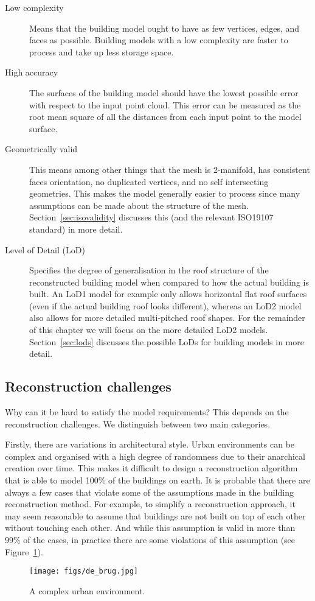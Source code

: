 \begin{description}
	\item[Low complexity] Means that the building model ought to have as few vertices, edges, and faces as possible. Building models with a low complexity are faster to process and take up less storage space.
	\item[High accuracy] The surfaces of the building model should have the lowest possible error with respect to the input point cloud. This error can be measured as the root mean square of all the distances from each input point to the model surface. 
	\item[Geometrically valid] This means among other things that the mesh is 2-manifold, has consistent faces orientation, no duplicated vertices, and no self intersecting geometries. This makes the model generally easier to process since many assumptions can be made about the structure of the mesh. Section~\ref{sec:isovalidity} discusses this (and the relevant ISO19107 standard) in more detail.
	\item[Level of Detail (LoD)] Specifies the degree of generalisation in the roof structure of the reconstructed building model when compared to how the actual building is built. An LoD1 model for example only allows horizontal flat roof surfaces (even if the actual building roof looks different), whereas an LoD2 model also allows for more detailed multi-pitched roof shapes. For the remainder of this chapter we will focus on the more detailed LoD2 models. Section~\ref{sec:lods} discusses the possible LoDs for building models in more detail.
\end{description}

\subsection{Reconstruction challenges}
Why can it be hard to satisfy the model requirements? This depends on the reconstruction challenges. We distinguish between two main categories.

Firstly, there are variations in architectural style. Urban environments can be complex and organised with a high degree of randomness due to their anarchical creation over time. This makes it difficult to design a reconstruction algorithm that is able to model 100\% of the buildings on earth. It is probable that there are always a few cases that violate some of the assumptions made in the building reconstruction method. For example, to simplify a reconstruction approach, it may seem reasonable to assume that buildings are not built on top of each other without touching each other. And while this assumption is valid in more than 99\% of the cases, in practice there are some violations of this assumption (see Figure~\ref{fig:debrug}).
\begin{figure}
	\centering
	\texttt{[image: figs/de\_brug.jpg]}
	\caption{A complex urban environment.}%
	\label{fig:debrug}
\end{figure}
	
